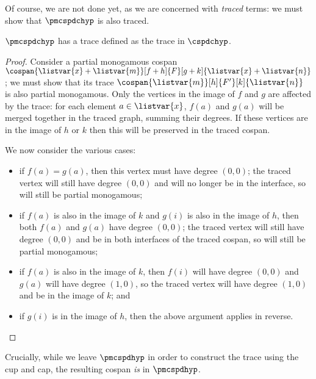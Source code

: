 Of course, we are not done yet, as we are concerned with \emph{traced} terms:
we must show that \(\pmcspdchyp\) is also traced.

\begin{theorem}
    \label{thm:partial-monogamous-ops}
    \(\pmcspdchyp\) has a trace defined as the trace in \(\cspdchyp\).
\end{theorem}
\begin{proof}
    Consider a partial monogamous cospan \(
        \cospan{\listvar{x} + \listvar{m}}[f + h]{F}[g + k]{\listvar{x} + \listvar{n}}
    \); we must show that its trace \(
        \cospan{\listvar{m}}[h]{F^\prime}[k]{\listvar{n}}
    \) is also partial monogamous.
    Only the vertices in the image of \(f\) and \(g\) are affected by the trace:
    for each element \(a \in \listvar{x}\), \(f(a)\) and \(g(a)\) will be merged
    together in the traced graph, summing their degrees.
    If these vertices are in the image of \(h\) or \(k\) then this will be
    preserved in the traced cospan.

    We now consider the various cases:
    \begin{itemize}
        \item if \(f(a) = g(a)\), then this vertex must have degree \((0, 0)\);
                the traced vertex will still have degree \((0, 0)\) and will no
                longer be in the interface, so will still be partial monogamous;
        \item if \(f(a)\) is also in the image of \(k\) and \(g(i)\) is also in
                the image of \(h\), then both \(f(a)\) and \(g(a)\) have degree
                \((0, 0)\); the traced vertex will still have degree
                \((0, 0)\) and be in both interfaces of the traced cospan, so
                will still be partial monogamous;
        \item if \(f(a)\) is also in the image of \(k\), then \(f(i)\) will have
                degree \((0, 0)\) and \(g(a)\) will have degree \((1,0)\), so
                the traced vertex will have degree \((1, 0)\) and be in the
                image of \(k\); and
        \item if \(g(i)\) is in the image of \(h\), then the above argument
                applies in reverse. \qedhere
    \end{itemize}
\end{proof}

Crucially, while we leave \(\pmcspdhyp\) in order to construct the trace using
the cup and cap, the resulting cospan \emph{is} in \(\pmcspdhyp\).

